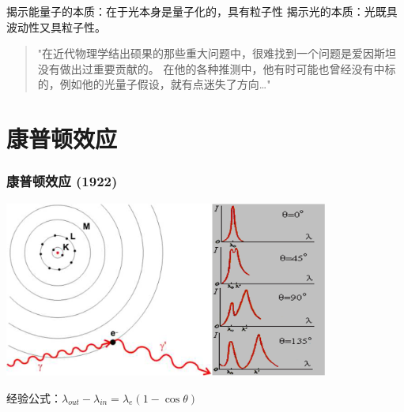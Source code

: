 \begin{frame} 
    \begin{tcolorbox4}[光量子假说的意义]
        \begin{itemize}
            \Item  揭示能量子的本质：在于光本身是量子化的，具有粒子性
            \Item  揭示光的本质：光既具波动性又具粒子性。
        \end{itemize}
    \end{tcolorbox4}
    \begin{quotation}
        "在近代物理学结出硕果的那些重大问题中，很难找到一个问题是爱因斯坦没有做出过重要贡献的。
        在他的各种推测中，他有时可能也曾经没有中标的，例如他的光量子假设，就有点迷失了方向\dots"  \\
    \end{quotation}
\end{frame}

\section{康普顿效应}

\begin{frame}   
    \frametitle{康普顿效应 (1922)}
    \begin{center}
        \includegraphics[width=0.8\textwidth]{figs/compton.png}
    \end{center}  
    经验公式：$\lambda_{out}-\lambda_{in}=\lambda_e(1-\cos \theta)$
\end{frame}

